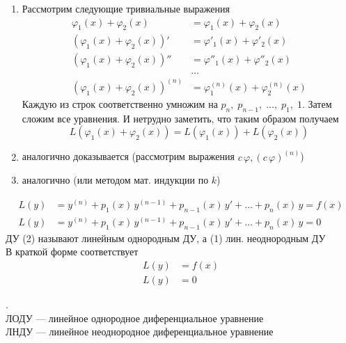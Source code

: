 \begin{Proof}
     \begin{enumerate}
        \item Рассмотрим следующие тривиальные выражения
        \begin{align*}
        \varphi_1(x)+\varphi_2(x) &=\varphi_1(x)+\varphi_2(x)\\
        (\varphi_1(x)+\varphi_2(x))' &=\varphi'_1(x)+\varphi'_2(x)\\
        (\varphi_1(x)+\varphi_2(x))'' &=\varphi''_1(x)+\varphi''_2(x)\\
        &\dots\\
        (\varphi_1(x)+\varphi_2(x))^{(n)} &=\varphi^{(n)}_1(x)+\varphi^{(n)}_2(x)
        \end{align*}
        Каждую из строк соответственно умножим на $p_n,\; p_{n-1},\; \dots, \; p_1,\; 1$.
        Затем сложим все уравнения. И нетрудно заметить, что таким образом получаем
        \[
            L(\varphi_1(x)+\varphi_2(x))=L(\varphi_1(x))+L(\varphi_2(x))
        \]
        
        \item аналогично доказывается (рассмотрим выражения $c\,\varphi, (c\,\varphi)^{(n)}$)
        
        \item аналогично (или методом мат. индукции по $k$)
    \end{enumerate}
\end{Proof}

\begin{Def}
    \begin{align}
        L(y)&=y^{(n)}+p_1(x)\,y^{(n-1)}+p_{n-1}(x)\,y'+\dots+p_n(x)\,y=f(x)\\
        L(y)&=y^{(n)}+p_1(x)\,y^{(n-1)}+p_{n-1}(x)\,y'+\dots+p_n(x)\,y=0
    \end{align}
    ДУ (2) называют линейным однородным ДУ, а (1) лин. неоднородным ДУ\\
    В краткой форме соответствует
    \begin{align*}
        L(y)&=f(x)\\
        L(y)&=0
    \end{align*}
\end{Def}

\begin{Note}.\\
    ЛОДУ --- линейное однородное диференциальное уравнение\\
    ЛНДУ --- линейное неоднородное диференциальное уравнение
\end{Note}

